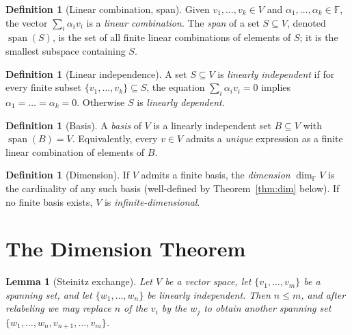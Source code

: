 \documentclass[11pt]{article}
\newtheorem{lemma}[theorem]{Lemma}
\theoremstyle{definition}
\newtheorem{definition}[theorem]{Definition}
\begin{document}
\begin{definition}[Linear combination, span]
Given $v_1, \dots, v_k \in V$ and $\alpha_1, \dots, \alpha_k \in \mathbb{F}$, the vector $\sum_i \alpha_i v_i$ is a \emph{linear combination}. The \emph{span} of a set $S \subseteq V$, denoted $\operatorname{span}(S)$, is the set of all finite linear combinations of elements of $S$; it is the smallest subspace containing $S$.
\end{definition}

\begin{definition}[Linear independence]
A set $S \subseteq V$ is \emph{linearly independent} if for every finite subset $\{v_1, \dots, v_k\} \subseteq S$, the equation $\sum_i \alpha_i v_i = 0$ implies $\alpha_1 = \dots = \alpha_k = 0$. Otherwise $S$ is \emph{linearly dependent}.
\end{definition}

\begin{definition}[Basis]
A \emph{basis} of $V$ is a linearly independent set $B \subseteq V$ with $\operatorname{span}(B) = V$. Equivalently, every $v \in V$ admits a \emph{unique} expression as a finite linear combination of elements of $B$.
\end{definition}

\begin{definition}[Dimension]
If $V$ admits a finite basis, the \emph{dimension} $\dim_{\mathbb{F}} V$ is the cardinality of any such basis (well-defined by Theorem~\ref{thm:dim} below). If no finite basis exists, $V$ is \emph{infinite-dimensional}.
\end{definition}

\section{The Dimension Theorem}

\begin{lemma}[Steinitz exchange]\label{lem:steinitz}
Let $V$ be a vector space, let $\{v_1, \dots, v_m\}$ be a spanning set, and let $\{w_1, \dots, w_n\}$ be linearly independent. Then $n \le m$, and after relabeling we may replace $n$ of the $v_i$ by the $w_j$ to obtain another spanning set $\{w_1, \dots, w_n, v_{n+1}, \dots, v_m\}$.
\end{lemma}
\end{document}

